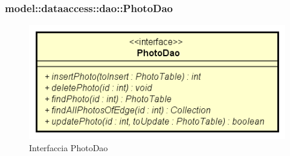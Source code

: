 \documentclass[../DefinizioneDiProdotto.tex]{subfiles}
\begin{document}
\subsubsection{model::dataaccess::dao::PhotoDao}

    \begin{figure}[H]
        \centering
        \includegraphics{img/PhotoDao.png}
        \caption{Interfaccia PhotoDao}\label{fig:model::dataaccess::dao::PhotoDao} 
    \end{figure}
\end{document}
